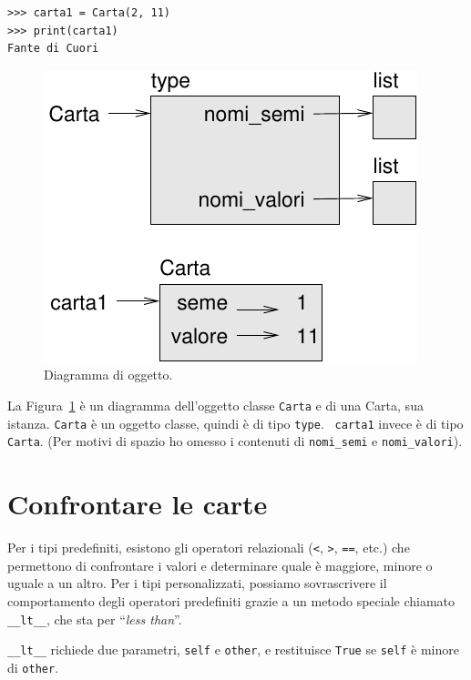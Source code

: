 \documentclass[10pt]{book}
\begin{document}
\begin{verbatim}
>>> carta1 = Carta(2, 11)
>>> print(carta1)
Fante di Cuori
\end{verbatim}

\begin{figure}
\centerline
{\includegraphics[scale=0.8]{figs/card1.pdf}}
\caption{Diagramma di oggetto.}
\label{fig.card1}
\end{figure}

La Figura~\ref{fig.card1} è un diagramma dell'oggetto classe {\tt Carta} e di una Carta, sua istanza.
{\tt Carta} è un oggetto classe, quindi è di tipo {\tt type}.  {\tt
carta1} invece è di tipo {\tt Carta}.  (Per motivi di spazio ho omesso i contenuti di \verb"nomi_semi" e \verb"nomi_valori").

\section{Confrontare le carte}
\label{comparecard}


Per i tipi predefiniti, esistono gli operatori relazionali
({\tt <}, {\tt >}, {\tt ==}, etc.)
che permettono di confrontare i valori e determinare quale è maggiore, minore o uguale a un altro. Per i tipi personalizzati, possiamo sovrascrivere il comportamento degli operatori predefiniti grazie a un metodo speciale chiamato
\verb"__lt__", che sta per ``{\em less than}''.  

\verb"__lt__" richiede due parametri, {\tt self} e {\tt other},
e restituisce {\tt True} se {\tt self} è minore di {\tt other}.
\end{document}

